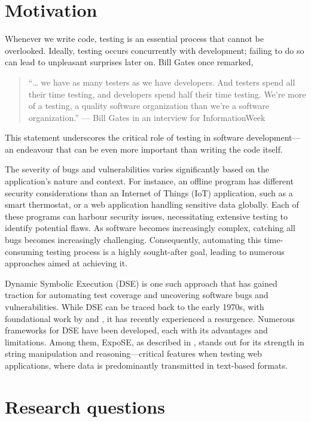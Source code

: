 
\section{Motivation}
\label{sec:motivation}

Whenever we write code, testing is an essential process that cannot be overlooked. Ideally, testing occurs concurrently with development; failing to do so can lead to unpleasant surprises later on. Bill Gates once remarked, 
\begin{quote}

    “… we have as many testers as we have developers. And testers spend all their time testing, and developers spend half their time testing. We're more of a testing, a quality software organization than we're a software organization.” — Bill Gates in an interview for InformationWeek \cite{bill_q_2002} 
\end{quote}

This statement underscores the critical role of testing in software development—an endeavour that can be even more important than writing the code itself.

The severity of bugs and vulnerabilities varies significantly based on the application's nature and context. For instance, an offline program has different security considerations than an Internet of Things (IoT) application, such as a smart thermostat, or a web application handling sensitive data globally. Each of these programs can harbour security issues, necessitating extensive testing to identify potential flaws. As software becomes increasingly complex, catching all bugs becomes increasingly challenging. Consequently, automating this time-consuming testing process is a highly sought-after goal, leading to numerous approaches aimed at achieving it.

Dynamic Symbolic Execution (DSE) is one such approach that has gained traction for automating test coverage and uncovering software bugs and vulnerabilities. While DSE can be traced back to the early 1970s, with foundational work by \citet{boyer_selectformal_1975} and \citet{king_new_1975}, it has recently experienced a resurgence. Numerous frameworks for DSE have been developed, each with its advantages and limitations. Among them, ExpoSE, as described in \citet{loring_expose_2017}, stands out for its strength in string manipulation and reasoning—critical features when testing web applications, where data is predominantly transmitted in text-based formats.


\section{Research questions}
\label{sec:research-questions}

